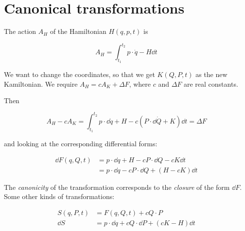 \section{Canonical transformations}

The action $A_H$ of the Hamiltonian $H(q, p, t)$ is

\begin{equation}
    A_H = \int_{t_1}^{t_2} p \cdot \Dot{q} - H \dd{t}
\end{equation}

We want to change the coordinates, so that we get $K(Q, P, t)$ as the new Kamiltonian. We require $A_H = c A_K + \Delta F$, where $c$ and $\Delta F$ are real constants.

Then

\begin{equation}
    A_H - c A_K = \int_{t_1}^{t_2}
    p \cdot \dd{\Dot{q}} + H - c (P \cdot \dd{\Dot{Q}} + K) \dd{t} 
    = \Delta F
\end{equation}

and looking at the corresponding differential forms:

\begin{align}
    \dd{F} (q, Q, t) &= p \cdot \dd{q} + H - c P \cdot \dd{Q} - cK \dd{t} \\  
    &= p \cdot \dd{q} - c P \cdot \dd{Q} + (H-cK)\dd{t}
\end{align}

The \emph{canonicity} of the transformation corresponds to the \emph{closure} of the form $\dd{F}$.
Some other kinds of transformations:

\begin{align}
    S(q, P, t) &= F(q, Q, t) + c Q \cdot P \\
    \dd{S} &= p \cdot \dd{q} + cQ \cdot \dd{P} + (cK-H) \dd{t}
\end{align}

